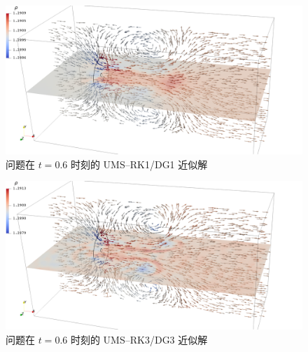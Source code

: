 \begin{figure}[h!]
\begin{centering}
\includegraphics[width=1\textwidth,height=0.26\textheight,keepaspectratio]{figures/upward/p=1/Frame60}
\par\end{centering}
\caption{\label{fig:upward_t=00003D6e-1_p=00003D1}问题在
$t=0.6$ 时刻的 UMS–RK1/DG1 近似解}
\end{figure}

\begin{figure}[h!]
\begin{centering}
\includegraphics[width=1\textwidth,height=0.26\textheight,keepaspectratio]{figures/upward/p=3/Frame60}
\par\end{centering}
\caption{\label{fig:upward_t=00003D6e-1_p=00003D3}问题在
$t=0.6$ 时刻的 UMS–RK3/DG3 近似解}
\end{figure}

